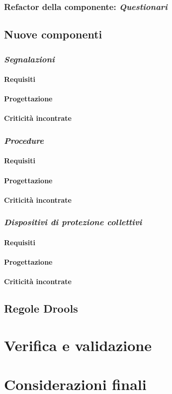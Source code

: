 \subsubsection{Refactor della componente: \textit{Questionari}}

\newpage
\subsection{Nuove componenti}
\subsubsection{\textit{Segnalazioni}}
	\paragraph{Requisiti}
	\paragraph{Progettazione}
	\paragraph{Criticità incontrate}
\newpage
\subsubsection{\textit{Procedure}}
	\paragraph{Requisiti}
	\paragraph{Progettazione}
	\paragraph{Criticità incontrate}
\newpage
\subsubsection{\textit{Dispositivi di protezione collettivi}}
	\paragraph{Requisiti}
	\paragraph{Progettazione}
	\paragraph{Criticità incontrate}
		

\newpage
\subsection{Regole Drools}

\newpage
\section{Verifica e validazione}
\newpage
\section{Considerazioni finali}